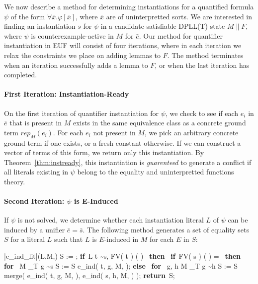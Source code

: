\documentclass{llncs}
\def\IF{\qtab\keyword{if}\ }
\def\THEN{\ \keyword{then}\ }
\def\ELSE{\untab\qtab\keyword{else}\ }
\def\FI{\untab}
\def\RETURN{\keyword{return}\ }
\def\ENDPROC{\untab}
\def\DOFOR{\qtab\keyword{for}\ }
\def\ENDFOR{\untab}
\def\keyword#1{\mbox{\normalshape\bf #1}}
\begin{document}
We now describe a method for determining instantiations for a quantified formula $\psi$ of the form $\forall \bar{x}. \varphi[\bar{x}]$, where $\bar{x}$ are of uninterpretted sorts.
We are interested in finding an instantiation $\bar{s}$ for $\psi$ in a candidate-satisfiable DPLL(T) state $M \parallel F$, where $\psi$ is counterexample-active in $M$ for $\bar{e}$.
Our method for quantifier instantiation in EUF will consist of four iterations, where in each iteration we relax the constraints we place on adding lemmas to $F$.
The method terminates when an iteration successfully adds a lemma to $F$, or when the last iteration has completed.

\paragraph{First Iteration: Instantiation-Ready}

On the first iteration of quantifier instantiation for $\psi$, we check to see if each $e_i$ in $\bar{e}$ that is present in $M$ exists in the same equivalence class as a concrete ground term $rep_M(e_i)$.
For each $e_i$ not present in $M$, we pick an arbitrary concrete ground term if one exists, or a fresh constant otherwise.
If we can construct a vector of terms of this form, we return only this instantiation.
By Theorem~\ref{thm:instready}, this instantiation is \emph{guarenteed} to generate a conflict if all literals existing in $\psi$ belong to the equality and uninterpretted functions theory.

\paragraph{Second Iteration: $\psi$ is E-Induced}

If $\psi$ is not solved, we determine whether each instantiation literal $L$ of $\psi$ can be induced by a unifier $\bar{e} = \bar{s}$.
The following method generates a set of equality sets $S$ for a literal $L$ such that $L$ is $E$-induced in $M$ for each $E$ in $S$:

\begin{minipage}[t]{.4\linewidth}
\begin{program}
\PROC |e\_ind\_lit|(L,M,\psi) \BODY
  S := \emptyset;
  \IF L  t \sim s, FV( t ) \cap {}( \psi ) \neq \emptyset \THEN
    \IF FV( s ) \cap {}( \psi ) = \emptyset \THEN
      \DOFOR {} M \models_T g \sim s
        S := S \cup e\_ind( t, g, M, \psi );
      \ENDFOR
    \ELSE
      \DOFOR {} g, h  M \models_T g \sim h
        S := S \cup merge( e\_ind( t, g, M, \psi ), e\_ind( s, h, M, \psi ) );
      \ENDFOR 
    \FI
  \FI
  \RETURN S;
\ENDPROC
\end{program}
\end{minipage}
\end{document}
